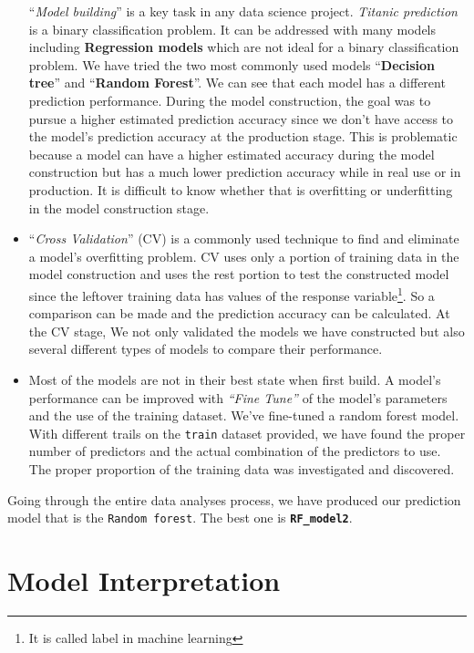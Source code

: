 \documentclass[
]{book}
\begin{document}
\begin{itemize}
  ``\emph{Model building}'' is a key task in any data science project. \emph{Titanic prediction} is a binary classification problem. It can be addressed with many models including \textbf{Regression models} which are not ideal for a binary classification problem. We have tried the two most commonly used models ``\textbf{Decision tree}'' and ``\textbf{Random Forest}''. We can see that each model has a different prediction performance. During the model construction, the goal was to pursue a higher estimated prediction accuracy since we don't have access to the model's prediction accuracy at the production stage. This is problematic because a model can have a higher estimated accuracy during the model construction but has a much lower prediction accuracy while in real use or in production. It is difficult to know whether that is overfitting or underfitting in the model construction stage.
\item
  ``\emph{Cross Validation}'' (CV) is a commonly used technique to find and eliminate a model's overfitting problem. CV uses only a portion of training data in the model construction and uses the rest portion to test the constructed model since the leftover training data has values of the response variable\footnote{It is called label in machine learning}. So a comparison can be made and the prediction accuracy can be calculated. At the CV stage, We not only validated the models we have constructed but also several different types of models to compare their performance.
\item
  Most of the models are not in their best state when first build. A model's performance can be improved with \emph{``Fine Tune''} of the model's parameters and the use of the training dataset. We've fine-tuned a random forest model. With different trails on the \texttt{train} dataset provided, we have found the proper number of predictors and the actual combination of the predictors to use. The proper proportion of the training data was investigated and discovered.
\end{itemize}

Going through the entire data analyses process, we have produced our prediction model that is the \texttt{Random\ forest}. The best one is \textbf{\texttt{RF\_model2}}.

\hypertarget{model-interpretation}{%
\section{Model Interpretation}\label{model-interpretation}}
\end{document}
